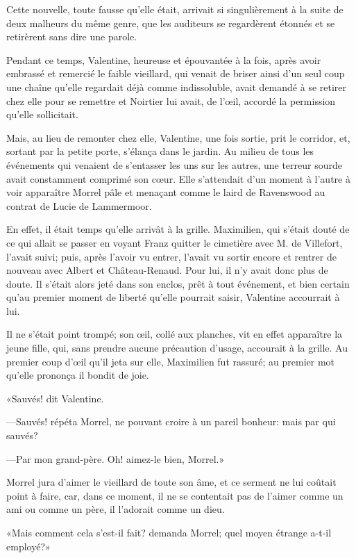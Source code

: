 Cette nouvelle, toute fausse qu'elle était, arrivait si singulièrement à la suite de deux malheurs du même genre, que les auditeurs se regardèrent étonnés et se retirèrent sans dire une parole. 

Pendant ce temps, Valentine, heureuse et épouvantée à la fois, après avoir embrassé et remercié le faible vieillard, qui venait de briser ainsi d'un seul coup une chaîne qu'elle regardait déjà comme indissoluble, avait demandé à se retirer chez elle pour se remettre et Noirtier lui avait, de l'œil, accordé la permission qu'elle sollicitait. 

Mais, au lieu de remonter chez elle, Valentine, une fois sortie, prit le corridor, et, sortant par la petite porte, s'élança dans le jardin. Au milieu de tous les événements qui venaient de s'entasser les uns sur les autres, une terreur sourde avait constamment comprimé son cœur. Elle s'attendait d'un moment à l'autre à voir apparaître Morrel pâle et menaçant comme le laird de Ravenswood au contrat de Lucie de Lammermoor. 

En effet, il était temps qu'elle arrivât à la grille. Maximilien, qui s'était douté de ce qui allait se passer en voyant Franz quitter le cimetière avec M. de Villefort, l'avait suivi; puis, après l'avoir vu entrer, l'avait vu sortir encore et rentrer de nouveau avec Albert et Château-Renaud. Pour lui, il n'y avait donc plus de doute. Il s'était alors jeté dans son enclos, prêt à tout événement, et bien certain qu'au premier moment de liberté qu'elle pourrait saisir, Valentine accourrait à lui. 

Il ne s'était point trompé; son œil, collé aux planches, vit en effet apparaître la jeune fille, qui, sans prendre aucune précaution d'usage, accourait à la grille. Au premier coup d'œil qu'il jeta sur elle, Maximilien fut rassuré; au premier mot qu'elle prononça il bondit de joie. 

«Sauvés! dit Valentine. 

—Sauvés! répéta Morrel, ne pouvant croire à un pareil bonheur: mais par qui sauvés? 

—Par mon grand-père. Oh! aimez-le bien, Morrel.» 

Morrel jura d'aimer le vieillard de toute son âme, et ce serment ne lui coûtait point à faire, car, dans ce moment, il ne se contentait pas de l'aimer comme un ami ou comme un père, il l'adorait comme un dieu. 

«Mais comment cela s'est-il fait? demanda Morrel; quel moyen étrange a-t-il employé?» 

